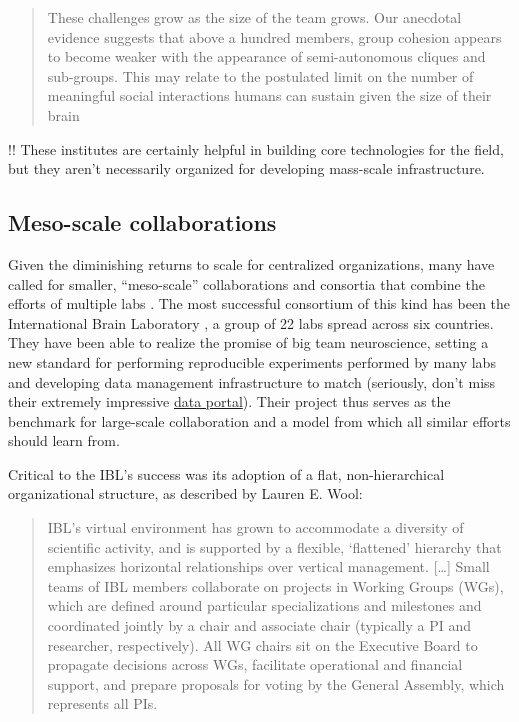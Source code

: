 \documentclass[notoc]{tufte-book}
\begin{document}
\begin{quote}
These challenges grow as the size of the team grows. Our anecdotal
evidence suggests that above a hundred members, group cohesion appears
to become weaker with the appearance of semi-autonomous cliques and
sub-groups. This may relate to the postulated limit on the number of
meaningful social interactions humans can sustain given the size of
their brain \citep{kochBigScienceTeam2016} 
\end{quote}

!! These institutes are certainly helpful in building core technologies
for the field, but they aren't necessarily organized for developing
mass-scale infrastructure.


\subsection{Meso-scale
collaborations}

Given the diminishing returns to scale for centralized organizations,
many have called for smaller, ``meso-scale'' collaborations and
consortia that combine the efforts of multiple labs \citep{mainenBetterWayCrack2016} . The most successful consortium of this
kind has been the International Brain Laboratory \citep{abbottInternationalLaboratorySystems2017, woolKnowledgeNetworksHow2020} , a group of 22 labs spread across six countries. They have been
able to realize the promise of big team neuroscience, setting a new
standard for performing reproducible experiments performed by many labs
\citep{laboratoryStandardizedReproducibleMeasurement2020}  and
developing data management infrastructure to match \citep{laboratoryDataArchitectureLargescale2020}  (seriously, don't miss
their extremely impressive
\href{https://data.internationalbrainlab.org/}{data portal}). Their
project thus serves as the benchmark for large-scale collaboration and a
model from which all similar efforts should learn from.

Critical to the IBL's success was its adoption of a flat,
non-hierarchical organizational structure, as described by Lauren E.
Wool:

\begin{quote}
IBL's virtual environment has grown to accommodate a diversity of
scientific activity, and is supported by a flexible, `flattened'
hierarchy that emphasizes horizontal relationships over vertical
management. {[}\ldots{]} Small teams of IBL members collaborate on
projects in Working Groups (WGs), which are defined around particular
specializations and milestones and coordinated jointly by a chair and
associate chair (typically a PI and researcher, respectively). All WG
chairs sit on the Executive Board to propagate decisions across WGs,
facilitate operational and financial support, and prepare proposals for
voting by the General Assembly, which represents all PIs. \citep{woolKnowledgeNetworksHow2020} 
\end{quote}
\end{document}
